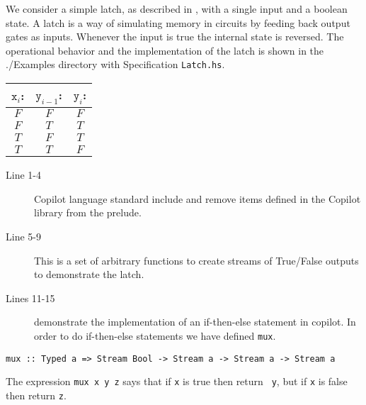 \begin{example} We consider a simple latch, as described in \cite{Farhat2004},
with a single input and a boolean state.
%
A latch is a way of simulating memory in circuits by feeding back output gates
as inputs.
%
Whenever the input is true the internal state is reversed.
%
The operational behavior and the implementation of the latch is shown in the
./Examples directory with Specification {\tt Latch.hs}.

\begin{center}
\begin{minipage}{0.25\linewidth}
\begin{tabular}{c|c||c}
$\mathtt{x}_i$: & $\mathtt{y}_{i-1}$: & $\mathtt{y}_i$:\\
\hline
$F$ & $F$ & $F$ \\
\hline
$F$ & $T$ & $T$ \\
\hline
$T$ & $F$ & $T$ \\
\hline
$T$ & $T$ & $F$
\end{tabular}
\end{minipage}
\end{center}
\end{example}



\begin{description}
  \item[Line 1-4] Copilot language standard include and remove 
  items defined in the Copilot library from the prelude.
  \item[Line 5-9] This is a set of arbitrary functions to create streams of
  True/False outputs to demonstrate the latch.
  \item[Lines 11-15] demonstrate the implementation of an if-then-else statement in copilot. In order to do if-then-else statements we have defined {\tt mux}.
\end{description}

%
\begin{lstlisting}[language = Copilot, frame = single]
mux :: Typed a => Stream Bool -> Stream a -> Stream a -> Stream a
\end{lstlisting}
%

The expression {\tt mux x y z} says that if {\tt x} is true then return {\tt
y}, but if {\tt x} is false then return {\tt z}.

